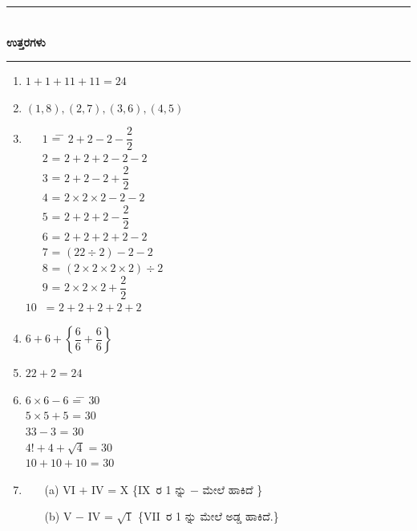 \smallskip

\begin{center}
\rule{5cm}{1pt}\\[2pt]
{\Large\bfseries ಉತ್ತರಗಳು}\\[-0.1cm]
\rule{5cm}{1pt}
\end{center}


\begin{enumerate}
\itemsep=5pt

\item $1 + 1 + 11 + 11 = 24$

\smallskip
\item $(1, 8), (2, 7), (3, 6), (4, 5)$

\smallskip
\item 
\begin{tabbing}
~~~$1$ \= = \= $2 + 2 - 2 - \dfrac{2}{2}$\\[0.2cm]
~~~$2$ \> = \> $2 + 2 + 2 - 2 - 2$\\[0.2cm]
~~~$3$\> = \> $2 + 2 - 2 + \dfrac{2}{2}$\\[0.2cm]
~~~$4$ \> = \> $2 \times 2 \times 2 - 2 - 2$\\[0.2cm]
~~~$5$ \> = \> $2 + 2 + 2 - \dfrac{2}{2}$\\[0.2cm]
~~~$6$ \> = \> $2 + 2 + 2 + 2 - 2$\\[0.2cm]
~~~$7$ \> = \> $(22 \div 2) - 2 - 2$\\[0.2cm]
~~~$8$ \> = \> $(2 \times 2 \times 2 \times 2) \div 2$\\[0.2cm]
~~~$9$ \> = \> $2 \times 2 \times 2 + \dfrac{2}{2}$\\[0.2cm]
$10$~ \> = \> $2 + 2 + 2 + 2 + 2$
\end{tabbing}

\smallskip
\item $6 + 6 +\left\{\dfrac{6}{6} + \dfrac{6}{6}\right\}$

\smallskip
\item $22 + 2 = 24$

\item 
\begin{tabbing}
$6 \times 6 - 6$ \qquad\=  = \= $30$\\
$5 \times 5 + 5$ \qquad\>  = \> $30$\\
$33 - 3$ \qquad\>  = \> $30$\\
$4! + 4 + \sqrt{4}$ \> = \> $30$\\
$10 + 10 + 10$ \qquad\> = \> $30$
\end{tabbing}

\item 
\begin{itemize}
\item[(a)] VI $+$ IV = X \{IX~ರ 1 ನ್ನು $-$ ಮೇಲೆ ಹಾಕಿದೆ \}
\item[(b)] V $-$ IV = $\sqrt{1}$ \{VII~ರ 1 ನ್ನು ಮೇಲೆ ಅಡ್ಡ ಹಾಕಿದೆ.\}
\end{itemize}


\end{enumerate}
